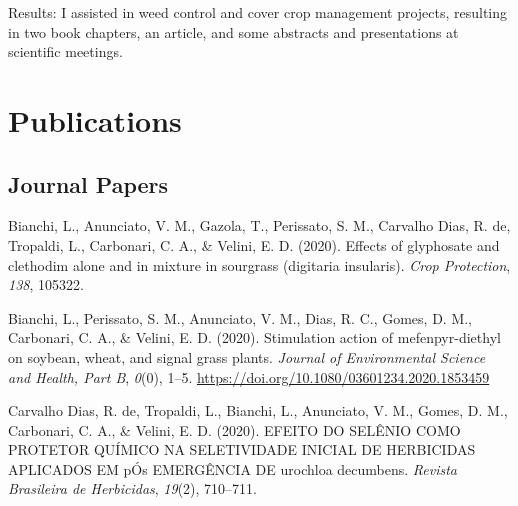 \documentclass[11pt, a4paper]{awesome-cv}
\begin{document}
\begin{cventries}
{\begin{cvitems}
\item Results: I assisted in weed control and cover crop management projects, resulting in two book chapters, an article, and some abstracts and presentations at scientific meetings.
\end{cvitems}}
\end{cventries}

\hypertarget{publications}{%
\section{Publications}\label{publications}}

\hypertarget{journal-papers}{%
\subsection{Journal Papers}\label{journal-papers}}

\begingroup
\setlength{\parindent}{-0.5in}
\setlength{\leftskip}{0.5in}

\hypertarget{refs_journals}{}
\leavevmode\hypertarget{ref-bianchi2020effects}{}%
Bianchi, L., Anunciato, V. M., Gazola, T., Perissato, S. M., Carvalho
Dias, R. de, Tropaldi, L., Carbonari, C. A., \& Velini, E. D. (2020).
Effects of glyphosate and clethodim alone and in mixture in sourgrass
(digitaria insularis). \emph{Crop Protection}, \emph{138}, 105322.

\leavevmode\hypertarget{ref-doi:10.1080ux2f03601234.2020.1853459}{}%
Bianchi, L., Perissato, S. M., Anunciato, V. M., Dias, R. C., Gomes, D.
M., Carbonari, C. A., \& Velini, E. D. (2020). Stimulation action of
mefenpyr-diethyl on soybean, wheat, and signal grass plants.
\emph{Journal of Environmental Science and Health, Part B}, \emph{0}(0),
1--5. \url{https://doi.org/10.1080/03601234.2020.1853459}

\leavevmode\hypertarget{ref-de2020efeito}{}%
Carvalho Dias, R. de, Tropaldi, L., Bianchi, L., Anunciato, V. M.,
Gomes, D. M., Carbonari, C. A., \& Velini, E. D. (2020). EFEITO DO
SEL{Ê}NIO COMO PROTETOR QU{Í}MICO NA SELETIVIDADE INICIAL DE HERBICIDAS
APLICADOS EM p{Ó}s EMERG{Ê}NCIA DE urochloa decumbens. \emph{Revista
Brasileira de Herbicidas}, \emph{19}(2), 710--711.
\end{document}
